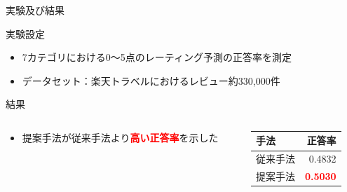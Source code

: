 \documentclass[aspectratio=43,unicode,10pt]{beamer}
\newcommand{\fire}[1]{\textcolor{red}{\textbf{#1}}}
\begin{document}
\begin{frame}{実験及び結果}{}
  \begin{block}{実験設定}
    \begin{itemize}
      \item 7カテゴリにおける0〜5点のレーティング予測の正答率を測定
      \item データセット：楽天トラベルにおけるレビュー約330,000件
    \end{itemize}
  \end{block}
  \begin{block}{結果}
    \begin{columns}[onlytextwidth,t]
      \begin{column}{0.6\linewidth}
        \begin{itemize}
          \item 提案手法が従来手法より\fire{高い正答率}を示した
        \end{itemize}
      \end{column}
      \begin{column}{0.4\linewidth}
        \begin{table}
          \centering
          \begin{tabular}{l | r} \label{tab:Accuracies}
            手法 & 正答率 \\
            \hline
            従来手法 & 0.4832 \\
            提案手法 & \fire{0.5030} \\
          \end{tabular}
        \end{table}
      \end{column}
    \end{columns}
  \end{block}
\end{frame}
\end{document}

